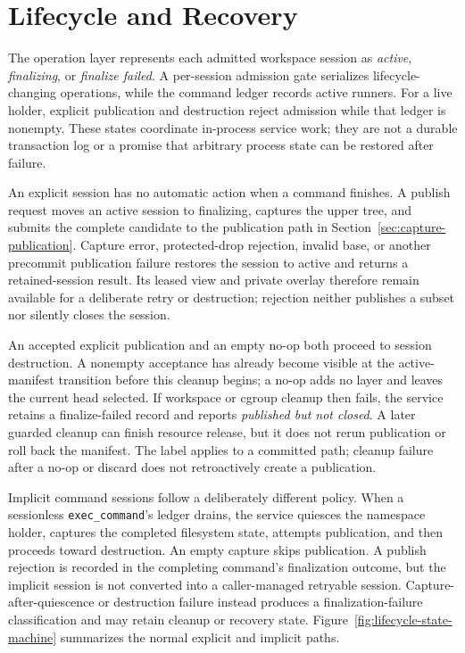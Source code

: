 \section{Lifecycle and Recovery}
\label{sec:lifecycle-recovery}

The operation layer represents each admitted workspace session as
\emph{active}, \emph{finalizing}, or \emph{finalize failed}.  A per-session
admission gate serializes lifecycle-changing operations, while the command
ledger records active runners.  For a live holder, explicit publication and
destruction reject admission while that ledger is nonempty.  These states
coordinate in-process service work; they are not a durable transaction log or
a promise that arbitrary process state can be restored after failure.

An explicit session has no automatic action when a command finishes.  A
publish request moves an active session to finalizing, captures the upper tree,
and submits the complete candidate to the publication path in
Section~\ref{sec:capture-publication}.  Capture error, protected-drop
rejection, invalid base, or another precommit publication failure restores the
session to active and returns a retained-session result.  Its leased view and
private overlay therefore remain available for a deliberate retry or
destruction; rejection neither publishes a subset nor silently closes the
session.

An accepted explicit publication and an empty no-op both proceed to session
destruction.  A nonempty acceptance has already become visible at the
active-manifest transition before this cleanup begins; a no-op adds no layer
and leaves the current head selected.  If workspace or cgroup cleanup then
fails, the service retains a finalize-failed record and reports
\emph{published but not closed}.  A later guarded cleanup can finish resource
release, but it does not rerun publication or roll back the manifest.  The
label applies to a committed path; cleanup failure after a no-op or discard
does not retroactively create a publication.

Implicit command sessions follow a deliberately different policy.  When a
sessionless \texttt{exec\_command}'s ledger drains, the service quiesces the
namespace holder, captures the completed filesystem state, attempts
publication, and then proceeds toward destruction.  An empty capture skips
publication.  A publish rejection is recorded in the completing command's
finalization outcome, but the implicit session is not converted into a
caller-managed retryable session.  Capture-after-quiescence or destruction
failure instead produces a finalization-failure classification and may retain
cleanup or recovery state.  Figure~\ref{fig:lifecycle-state-machine}
summarizes the normal explicit and implicit paths.

